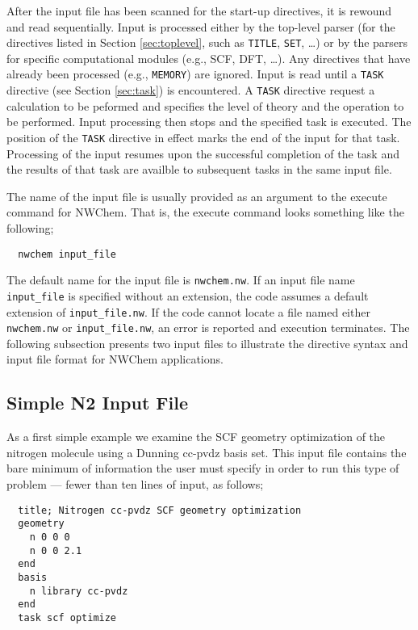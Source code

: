After the input file has been scanned for the start-up directives, it
is rewound and read sequentially.  Input is processed either by the
top-level parser (for the directives listed in Section
\ref{sec:toplevel}, such as \verb+TITLE+, \verb+SET+, \ldots) or by
the parsers for specific computational modules (e.g., SCF, DFT,
\ldots).  Any directives that have already been processed (e.g.,
\verb+MEMORY+) are ignored.  Input is read until a \verb+TASK+
directive (see Section \ref{sec:task}) is encountered.  A \verb+TASK+
directive request a calculation to be peformed and specifies the level
of theory and the operation to be performed.  Input processing then
stops and the specified task is executed.  The position of the
\verb+TASK+ directive in effect marks the end of the input for that
task.  Processing of the input resumes upon the successful completion
of the task and the results of that task are availble to subsequent
tasks in the same input file.

The name of the input file is usually provided as an argument to the
execute command for NWChem.  That is, the execute command looks
something like the following;

\begin{verbatim}
  nwchem input_file
\end{verbatim}

The default name for the input file is \verb+nwchem.nw+.  If an input
file name \verb+input_file+ is specified without an extension, the code
assumes a default extension of \verb+input_file.nw+.  If the code cannot
locate a file named either \verb+nwchem.nw+ or \verb+input_file.nw+, an 
error is reported and execution terminates.  The following
subsection presents two input files to illustrate the directive syntax and 
input file format for NWChem applications.

\subsection{Simple N2 Input File}
\label{sec:simplesample}

As a first simple example we examine the SCF geometry optimization of
the nitrogen molecule using a Dunning cc-pvdz basis set.  This input
file contains the bare minimum of information the user must specify in
order to run this type of problem --- fewer than ten lines of input,
as follows;
\begin{verbatim}
  title; Nitrogen cc-pvdz SCF geometry optimization
  geometry 
    n 0 0 0
    n 0 0 2.1
  end
  basis
    n library cc-pvdz
  end
  task scf optimize
\end{verbatim}

